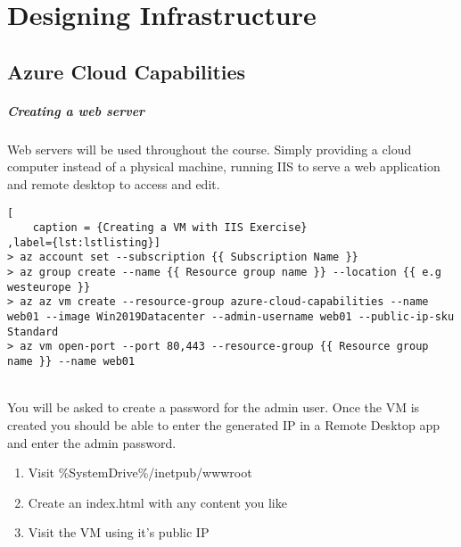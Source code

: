 \documentclass[a4paper,14pt]{report}
\author{Hugh McKenna}
\begin{document}
\chapter{Designing Infrastructure}

\section{Azure Cloud Capabilities}

\paragraph{Creating a web server}
Web servers will be used throughout the course. Simply providing a cloud computer instead of a
physical machine, running IIS to serve a web application and remote desktop to access and edit.

\begin{lstlisting}[
    caption = {Creating a VM with IIS Exercise}
,label={lst:lstlisting}]
> az account set --subscription {{ Subscription Name }}
> az group create --name {{ Resource group name }} --location {{ e.g westeurope }}
> az az vm create --resource-group azure-cloud-capabilities --name web01 --image Win2019Datacenter --admin-username web01 --public-ip-sku Standard
> az vm open-port --port 80,443 --resource-group {{ Resource group name }} --name web01
\end{lstlisting}

\\
You will be asked to create a password for the admin user. Once the VM is created you should
be able to enter the generated IP in a Remote Desktop app and enter the admin password.
\begin{enumerate}
    \item Visit \%SystemDrive\%/inetpub/wwwroot
    \item Create an index.html with any content you like
    \item Visit the VM using it's public IP
\end{enumerate}
\end{document}

